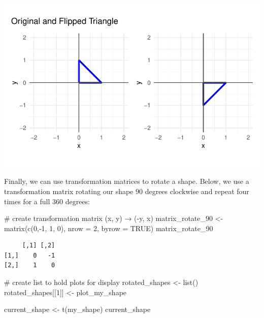 \documentclass[
  letterpaper,
  DIV=11,
  numbers=noendperiod]{scrartcl}
\newenvironment{Shaded}{\begin{snugshade}}{\end{snugshade}}
\newcommand{\AttributeTok}[1]{\textcolor[rgb]{0.40,0.45,0.13}{#1}}
\newcommand{\CommentTok}[1]{\textcolor[rgb]{0.37,0.37,0.37}{#1}}
\newcommand{\ConstantTok}[1]{\textcolor[rgb]{0.56,0.35,0.01}{#1}}
\newcommand{\DecValTok}[1]{\textcolor[rgb]{0.68,0.00,0.00}{#1}}
\newcommand{\FunctionTok}[1]{\textcolor[rgb]{0.28,0.35,0.67}{#1}}
\newcommand{\NormalTok}[1]{\textcolor[rgb]{0.00,0.23,0.31}{#1}}
\newcommand{\OtherTok}[1]{\textcolor[rgb]{0.00,0.23,0.31}{#1}}
\newcommand{\SpecialCharTok}[1]{\textcolor[rgb]{0.37,0.37,0.37}{#1}}
\begin{document}
\includegraphics{Assignment-1---Fox_files/figure-pdf/flip-1.pdf}

Finally, we can use transformation matrices to rotate a shape. Below, we
use a transformation matrix rotating our shape 90 degrees clockwise and
repeat four times for a full 360 degrees:

\begin{Shaded}
\begin{Highlighting}[]
\CommentTok{\# create transformation matrix (x, y) → ({-}y, x)}
\NormalTok{matrix\_rotate\_90 }\OtherTok{\textless{}{-}} \FunctionTok{matrix}\NormalTok{(}\FunctionTok{c}\NormalTok{(}\DecValTok{0}\NormalTok{,}\SpecialCharTok{{-}}\DecValTok{1}\NormalTok{,}
                             \DecValTok{1}\NormalTok{, }\DecValTok{0}\NormalTok{),}
                           \AttributeTok{nrow =} \DecValTok{2}\NormalTok{, }\AttributeTok{byrow =} \ConstantTok{TRUE}\NormalTok{)}
\NormalTok{matrix\_rotate\_90}
\end{Highlighting}
\end{Shaded}

\begin{verbatim}
     [,1] [,2]
[1,]    0   -1
[2,]    1    0
\end{verbatim}

\begin{Shaded}
\begin{Highlighting}[]
\CommentTok{\# create list to hold plots for display}
\NormalTok{rotated\_shapes }\OtherTok{\textless{}{-}} \FunctionTok{list}\NormalTok{()}
\NormalTok{rotated\_shapes[[}\DecValTok{1}\NormalTok{]] }\OtherTok{\textless{}{-}}\NormalTok{ plot\_my\_shape}

\NormalTok{current\_shape }\OtherTok{\textless{}{-}} \FunctionTok{t}\NormalTok{(my\_shape)}
\NormalTok{current\_shape}
\end{Highlighting}
\end{Shaded}
\end{document}
